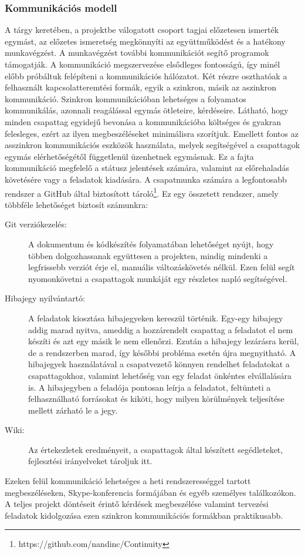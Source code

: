     \subsubsection{Kommunikációs modell}

	A tárgy keretében, a projektbe válogatott csoport tagjai előzetesen ismerték egymást, az előzetes ismeretség megkönnyíti az együttműködést és a hatékony munkavégzést. A munkavégzést további kommunikációt segítő programok támogatják.
	A kommunikáció megszervezése elsődleges fontosságú, így minél előbb próbáltuk felépíteni a kommunikációs hálózatot. Két részre oszthatóak a felhasznált kapcsolatteremtési formák, egyik a szinkron, másik az aszinkron kommunikáció. Szinkron kommunikációban lehetséges a folyamatos kommunikálás, azonnali reagálással egymás ötleteire, kérdéseire. Látható, hogy minden csapattag egyidejű bevonása a kommunikációba költséges és gyakran felesleges, ezért az ilyen megbeszéléseket minimálisra szorítjuk. Emellett fontos az asszinkron kommunikációs eszközök használata, melyek segítségével a csapattagok egymás elérhetőségétől függetlenül üzenhetnek egymásnak. Ez a fajta kommunikáció megfelelő a státusz jelentések számára, valamint az előrehaladás követésére vagy a feladatok kiadására.
	A csapatmunka számára a legfontosabb rendszer a GitHub által biztosított tároló\footnote{https://github.com/nandinc/Continuity}. Ez egy összetett rendszer, amely többféle lehetőséget biztosít számunkra:
	\begin{description}
		\item[Git verziókezelés:]
			A dokumentum és kódkészítés folyamatában lehetőséget nyújt, hogy többen dolgozhassanak együttesen a projekten, mindig mindenki a legfrissebb verziót érje el, manuális változáskövetés nélkül. Ezen felül segít nyomonkövetni a csapattagok munkáját egy részletes napló segítségével. %
		\item[Hibajegy nyilvántartó:] %
			A feladatok kiosztása hibajegyeken kereszül történik. Egy-egy hibajegy addig marad nyitva, ameddig a hozzárendelt csapattag a feladatot el nem készíti és azt egy másik le nem ellenőrzi. Ezután a hibajegy lezárásra kerül, de a rendszerben marad, így későbbi probléma esetén újra megnyitható. A hibajegyek használatával a csapatvezető könnyen rendelhet feladatokat a csapattagokhoz, valamint lehetőség van egy feladat önkéntes elvállalására is. A hibajegyben a feladója pontosan leírja a feladatot, feltünteti a felhasználható forrásokat és kiköti, hogy milyen körülmények teljesítése mellett zárható le a jegy.
		\item[Wiki:]
			Az értekezletek eredményeit, a csapattagok által készített segédleteket, fejlesztési irányelveket tároljuk itt.
	\end{description}
	Ezeken felül kommunikáció lehetséges a heti rendszerességgel tartott megbeszéléseken, Skype-konferencia formájában és egyéb személyes találkozókon. A teljes projekt döntéseit érintő kérdések megbeszélése valamint tervezési feladatok kidolgozása ezen szinkron kommunikációs formákban praktikusabb.

